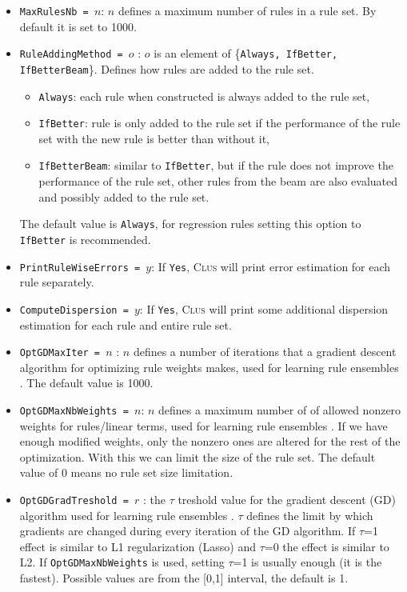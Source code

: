\documentclass[a4paper]{report}
\newcommand{\clus}{\textsc{Clus}}
\begin{document}
\begin{itemize}
	\item \texttt{MaxRulesNb = $n$}: $n$ defines a maximum number of rules in a rule set. By default it is set to 1000.
	\item \texttt{RuleAddingMethod = $o$} : $o$ is an element of \{\texttt{Always, IfBetter, IfBetterBeam}\}. Defines how rules are added to the rule set.
	\begin{itemize}
		\item \texttt{Always}: each rule when constructed is always added to the rule set,
		\item \texttt{IfBetter}: rule is only added to the rule set if the performance of the rule set with the new rule is better than without it,
		\item \texttt{IfBetterBeam}: similar to \texttt{IfBetter}, but if the rule does not improve the performance of the rule set, other rules from the beam are also evaluated and possibly added to the rule set.
	\end{itemize}
	The default value is \texttt{Always}, for regression rules setting this option to \texttt{IfBetter} is recommended.
	\item \texttt{PrintRuleWiseErrors = $y$}: If \texttt{Yes},  \clus{} will print error estimation for each rule separately.
	\item {\tt ComputeDispersion = $y$}: If \texttt{Yes},  \clus{} will print some additional dispersion estimation for each rule and entire rule set.
	\item \texttt{OptGDMaxIter = $n$} : $n$ defines a number of iterations that a gradient descent algorithm for
optimizing rule weights makes, used for learning rule ensembles \cite{Aho2009}. The default value is 1000.
	\item \texttt{OptGDMaxNbWeights = $n$}: $n$ defines a maximum number of of allowed nonzero weights for
rules/linear terms, used for learning rule ensembles \cite{Aho2009}. If we have enough modified weights, only the nonzero ones are altered for the rest of the optimization. With this we can limit the size of the rule set. The default value of 0 means no rule set size limitation.
	\item \texttt{OptGDGradTreshold = $r$} : the $\tau$ treshold value for the gradient descent (GD) algorithm used for learning rule ensembles \cite{Aho2009}. $\tau$ defines the limit by which gradients are changed during every iteration of the GD algorithm. If $\tau$=1 effect is similar to L1 regularization (Lasso) and $\tau$=0 the effect is similar to L2. If \texttt{OptGDMaxNbWeights} is used, setting $\tau$=1 is usually enough (it is the fastest). Possible values are from the [0,1] interval, the default is 1.

\end{itemize}
\end{document}
